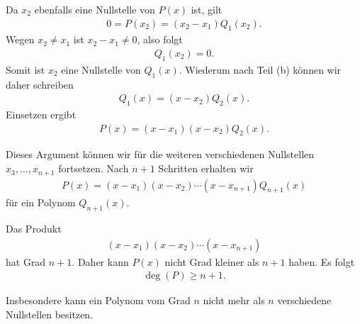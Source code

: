 \documentclass[a4paper,10pt]{article}
\begin{document}
{\begin{enumerate}[label=(\alph*)]
    Da $x_2$ ebenfalls eine Nullstelle von $P(x)$ ist, gilt
    \begin{align*}
        0=P(x_2)=(x_2-x_1)Q_1(x_2).
    \end{align*}
    Wegen $x_2\neq x_1$ ist $x_2-x_1\neq0$, also folgt
    \begin{align*}
        Q_1(x_2)=0.
    \end{align*}
    Somit ist $x_2$ eine Nullstelle von $Q_1(x)$. Wiederum nach Teil (b)
    können wir daher schreiben
    \begin{align*}
        Q_1(x)=(x-x_2)Q_2(x).
    \end{align*}
    Einsetzen ergibt
    \begin{align*}
        P(x)=(x-x_1)(x-x_2)Q_2(x).
    \end{align*}

    Dieses Argument können wir für die weiteren verschiedenen Nullstellen
    $x_3,\ldots,x_{n+1}$ fortsetzen. Nach $n+1$ Schritten erhalten wir
    \begin{align*}
        P(x)
        =(x-x_1)(x-x_2)\cdots(x-x_{n+1})Q_{n+1}(x)
    \end{align*}
    für ein Polynom $Q_{n+1}(x)$.

    Das Produkt
    \begin{align*}
        (x-x_1)(x-x_2)\cdots(x-x_{n+1})
    \end{align*}
    hat Grad $n+1$. Daher kann $P(x)$ nicht Grad kleiner als $n+1$ haben. Es folgt
    \begin{align*}
        \deg(P)\ge n+1.
    \end{align*}

    Insbesondere kann ein Polynom vom Grad $n$ nicht mehr als $n$
    verschiedene Nullstellen besitzen.
\end{enumerate}
}
\end{document}
